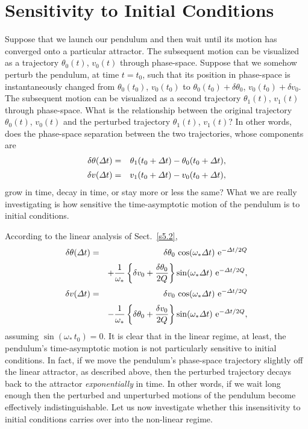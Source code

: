 \section{Sensitivity to Initial Conditions}
Suppose that we launch  our pendulum  and then wait until its motion has converged onto
a particular attractor. The subsequent motion can be visualized as a
trajectory $\theta_0(t)$, $v_0(t)$ through phase-space. Suppose that we somehow
perturb the pendulum, at time $t=t_0$, such that its position in phase-space
is instantaneously changed from  $\theta_0(t_0)$, $v_0(t_0)$ to $\theta_0(t_0)+\delta\theta_0$, $v_0(t_0)
+\delta v_0$. The subsequent motion can be visualized as a second trajectory
   $\theta_1(t)$, $v_1(t)$ through phase-space. What is the relationship
between the original trajectory $\theta_0(t)$, $v_0(t)$ and the perturbed trajectory 
$\theta_1(t)$, $v_1(t)$?
In other words, does the phase-space separation between the two trajectories,
whose components are
\begin{eqnarray}
\delta\theta({\mit\Delta} t) &=& \theta_1(t_0+{\mit\Delta} t)-\theta_0(t_0+{\mit\Delta} t),\\[0.5ex]
\delta v({\mit\Delta} t) &=& v_1(t_0+{\mit\Delta} t)-v_0(t_0+{\mit\Delta} t),
\end{eqnarray}
grow in time,  decay in time, or stay more or less the same? What
we are really investigating is how sensitive  the time-asymptotic
 motion of the pendulum  is to initial conditions. 

According to the linear analysis of Sect.~\ref{s5.2},
\begin{eqnarray}
\delta\theta({\mit\Delta} t) &=& \delta\theta_0\,\cos(\omega_\ast {\mit\Delta} t)\,\,{\rm e}^{-{\mit\Delta} t/2Q}\nonumber\\[0.5ex]&&
+ \frac{1}{\omega_\ast}\left\{\delta v_0 + \frac{\delta\theta_0}{2Q}\right\}
\sin(\omega_\ast {\mit\Delta} t)\,\,{\rm e}^{-{\mit\Delta} t/2Q},\\[0.5ex]
\delta v({\mit\Delta} t) &=& \delta v_0\,\cos(\omega_\ast {\mit\Delta} t)\,\,{\rm e}^{-{\mit\Delta} t/2Q}
\nonumber\\[0.5ex]&&
- \frac{1}{\omega_\ast}\left\{\delta \theta_0 + \frac{\delta v_0}{2Q}\right\}
\sin(\omega_\ast {\mit\Delta} t)\,\,{\rm e}^{- {\mit\Delta} t/2Q},
\end{eqnarray}
assuming $\sin(\omega_\ast\,t_0)=0$.
It is clear that in the linear regime, at least, the pendulum's 
time-asymptotic motion  is not particularly sensitive
to initial conditions. In fact, if we move the pendulum's phase-space trajectory slightly off
the linear attractor, as described above, then
 the perturbed
trajectory   decays  back to the attractor {\em exponentially} in time.
In other words, if we wait long enough then the perturbed and unperturbed motions of the pendulum
become effectively indistinguishable. Let us now investigate whether this insensitivity to
initial conditions carries over into the non-linear regime.


